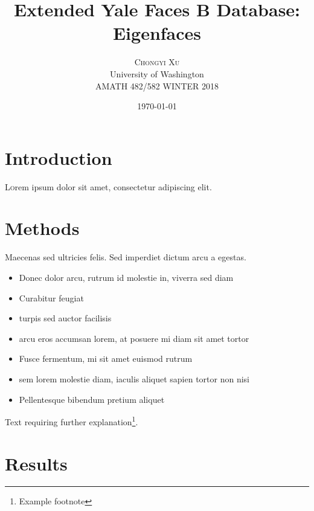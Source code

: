 \documentclass[twoside,twocolumn]{article}
\title{Extended Yale Faces B Database: Eigenfaces}
\author{%
    \textsc{Chongyi Xu} \\[1ex] %
    \normalsize University of Washington \\ %
    \normalsize AMATH 482/582 WINTER 2018 
    }
\date{\today}
\begin{document}
    
    \maketitle
    
    
    \section{Introduction}
    
    \lettrine[nindent=0em,lines=3]{L} orem ipsum dolor sit amet, consectetur adipiscing elit.
    \blindtext %
    
    \blindtext %
    
    
    \section{Methods}
    
    Maecenas sed ultricies felis. Sed imperdiet dictum arcu a egestas. 
    \begin{itemize}
    \item Donec dolor arcu, rutrum id molestie in, viverra sed diam
    \item Curabitur feugiat
    \item turpis sed auctor facilisis
    \item arcu eros accumsan lorem, at posuere mi diam sit amet tortor
    \item Fusce fermentum, mi sit amet euismod rutrum
    \item sem lorem molestie diam, iaculis aliquet sapien tortor non nisi
    \item Pellentesque bibendum pretium aliquet
    \end{itemize}
    \blindtext %
    
    Text requiring further explanation\footnote{Example footnote}.
    
    
    \section{Results}
    
\end{document}
